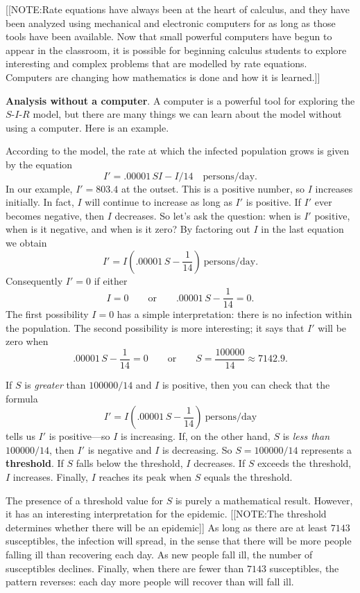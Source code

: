 [[NOTE:Rate equations have always been at the
  heart of calculus, and they have been analyzed using mechanical and
  electronic computers for as long as those tools have been available.
  Now that small powerful computers have begun to appear in the
  classroom, it is possible for beginning calculus students to explore
  interesting and complex problems that are modelled by rate
  equations.  Computers are changing how mathematics is done and how
  it is learned.]]








{\bf Analysis without a computer}.  A computer is a powerful
tool for exploring the $S$-$I$-$R$ model, but there are many things we
can learn about the model without using a computer.  Here is an
example.

According to the model, the rate at which the infected population
grows is given by the equation
\[
I' = .00001 \, S I - I/14 \quad \mbox{persons/day.}
\]
In our example, $I' = 803.4$ at the outset.  This is a positive
number, so $I$ increases initially.  In fact, $I$ will continue to
increase as long as $I'$ is positive.  If $I'$ ever becomes negative,
then $I$ decreases.  So let's ask the question: when is $I'$ positive,
when is it negative, and when is it zero?  By factoring out $I$ in the
last equation we obtain
\[
I' = I \left( .00001 \, S - \dfrac{1}{14} \right) \ \mbox{persons/day.}
\]
Consequently $I' = 0$ if either
\[
I = 0 \qquad \mbox{or} \qquad .00001 \, S - \dfrac{1}{14} = 0.
\]
The first possibility $I = 0$ has a simple interpretation: there is no
infection within the population.  The second possibility is more
interesting; it says that $I'$ will be zero when
\[
.00001 \, S - \dfrac{1}{14} = 0 \qquad \mbox{or} \qquad
		S = \dfrac{100000}{14} \approx 7142.9.
\]

If $S$ is {\em greater\/} than $100000/14$ and $I$ is positive, then
you can check that the formula
\[
I' = I \left( .00001 \, S - \dfrac{1}{14} \right) 
		\ \mbox{persons/day}
\]
tells us $I'$ is positive---so $I$ is increasing.  If, on the other
hand, $S$ is {\em less than\/} $100000/14$, then $I'$ is negative and
$I$ is decreasing.  So $S = 100000/14$ represents a {\bf
  threshold}.\label{`threshold'} If $S$ falls below
the threshold, $I$ decreases.  If $S$ exceeds the threshold, $I$
increases.  Finally, $I$ reaches its peak when $S$ equals the
threshold.

The presence of a threshold value for $S$ is purely a  mathematical result.  However, it has an interesting interpretation for the epidemic.  
[[NOTE:The threshold determines whether there will be an epidemic]]
As long as there are at least $7143$ susceptibles, the infection will
spread, in the sense that there will be more people falling ill than
recovering each day.  As new people fall ill, the number of
susceptibles declines.  Finally, when there are fewer than $7143$
susceptibles, the pattern reverses: each day more people will recover
than will fall ill.

